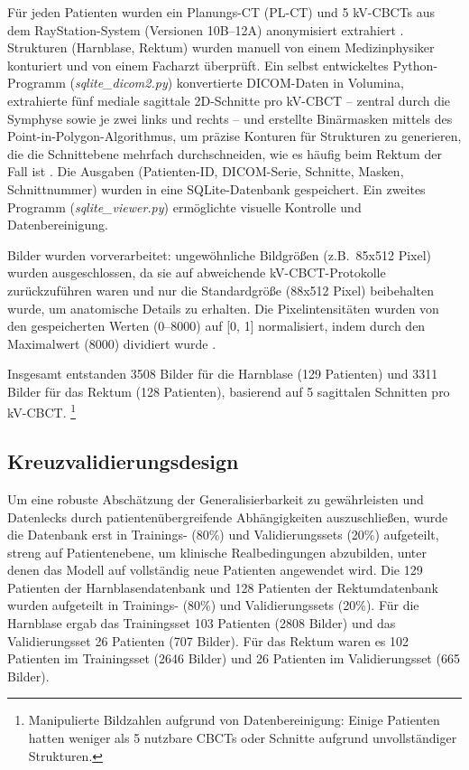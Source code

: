 \documentclass{article}
\begin{document}
Für jeden Patienten wurden ein Planungs-CT (PL-CT) und 5 kV-CBCTs aus dem
RayStation-System (Versionen 10B–12A) anonymisiert extrahiert \citep{zwart2022}.
Strukturen (Harnblase, Rektum) wurden manuell von einem Medizinphysiker
konturiert und von einem Facharzt überprüft. Ein selbst entwickeltes
Python-Programm (\textit{sqlite\_dicom2.py}) \citep{rhone_repo} konvertierte
DICOM-Daten in Volumina, extrahierte fünf mediale sagittale 2D-Schnitte pro
kV-CBCT – zentral durch die Symphyse sowie je zwei links und rechts – und
erstellte Binärmasken mittels des Point-in-Polygon-Algorithmus, um präzise
Konturen für Strukturen zu generieren, die die Schnittebene mehrfach
durchschneiden, wie es häufig beim Rektum der Fall ist \citep{salomon1978}. Die
Ausgaben (Patienten-ID, DICOM-Serie, Schnitte, Masken, Schnittnummer) wurden in
eine SQLite-Datenbank gespeichert. Ein zweites Programm
(\textit{sqlite\_viewer.py}) \citep{rhone_repo} ermöglichte visuelle Kontrolle
und Datenbereinigung.

Bilder wurden vorverarbeitet: ungewöhnliche Bildgrößen (z.B.\ 85x512 Pixel)
wurden ausgeschlossen, da sie auf abweichende kV-CBCT-Protokolle zurückzuführen
waren und nur die Standardgröße (88x512 Pixel) beibehalten wurde, um anatomische
Details zu erhalten. Die Pixelintensitäten wurden von den gespeicherten Werten
(0–8000) auf [0, 1] normalisiert, indem durch den Maximalwert (8000) dividiert
wurde \citep{stevens2020}.

Insgesamt entstanden 3508 Bilder für die Harnblase (129 Patienten) und 3311
Bilder für das Rektum (128 Patienten), basierend auf 5 sagittalen Schnitten pro
kV-CBCT. \footnote{Manipulierte Bildzahlen aufgrund von Datenbereinigung: Einige
Patienten hatten weniger als 5 nutzbare CBCTs oder Schnitte aufgrund
unvollständiger Strukturen.}

\subsection{Kreuzvalidierungsdesign}
Um eine robuste Abschätzung der Generalisierbarkeit zu gewährleisten und
Datenlecks durch patientenübergreifende Abhängigkeiten auszuschließen, wurde
die Datenbank erst in Trainings- (80\%) und Validierungssets (20\%) aufgeteilt, 
streng auf Patientenebene, um klinische Realbedingungen abzubilden, unter 
denen das Modell auf vollständig neue Patienten angewendet wird. 
Die 129 Patienten der Harnblasendatenbank und 128 Patienten der Rektumdatenbank
wurden aufgeteilt in Trainings- (80\%) und Validierungssets (20\%).
Für die Harnblase ergab das Trainingsset 103 Patienten (2808 Bilder) und das
Validierungsset 26 Patienten (707 Bilder). Für das Rektum waren es 102 Patienten im
Trainingsset (2646 Bilder) und 26 Patienten im Validierungsset (665 Bilder).
\end{document}
